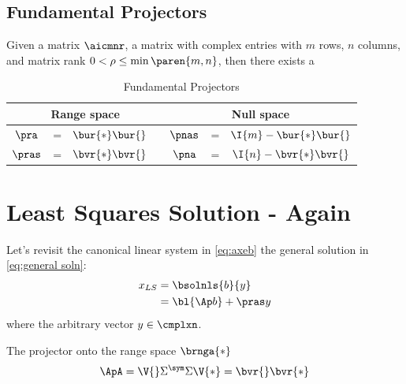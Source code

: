\subsection{Fundamental Projectors}  %
Given a matrix $\aicmnr$, a matrix with complex entries with $m$ rows, $n$ columns, and matrix rank $0<\rho\le\min\paren{m,n}$, then there exists a 

\begin{table}[htbp]  %
    \caption{Fundamental Projectors}
    \begin{center}
        \begin{tabular}{ccccccc}
            \multicolumn{4}{c}{Range space} & \multicolumn{3}{c}{Null space} \\\hline
            $\pra$  & = & $\bur{*}\bur{}$ && $\pnas$  & = & $\I{m} - \bur{*}\bur{}$\\
            $\pras$ & = & $\bvr{*}\bvr{}$ && $\pna$  & = & $\I{n} - \bvr{*}\bvr{}$\\
        \end{tabular}
    \end{center}
\end{table}%

\section{Least Squares Solution - Again}  %
Let's revisit the canonical linear system in \eqref{eq:axeb} the general solution in \eqref{eq:general soln}:
  \begin{equation*}   %
   \begin{split}
    x_{LS} 
      &= \bsolnls{b}{y} \\
      &= \bl{\Ap b} + \pras y
   \end{split}
  \label{eq:}
  \end{equation*}
where the arbitrary vector $y\in\cmplxn$.

The projector onto the range space $\brnga{*}$
  \begin{equation*}   %
      \ApA = \V{}\Sigma^{\sym}\Sigma{}\V{*} = \bvr{} \bvr{*}
  \end{equation*}

\endinput
